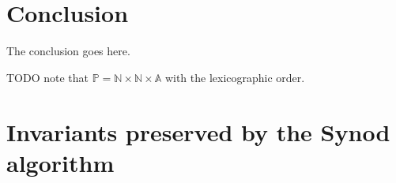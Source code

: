 \documentclass[journal]{IEEEtran}
\begin{document}




\section{Conclusion}
The conclusion goes here.

TODO note that $\mathbb P = \mathbb N \times \mathbb N \times \mathbb A$
with the lexicographic order.





%


\appendices
\section{Invariants preserved by the Synod algorithm}
\label{synod-safety}
\end{document}
